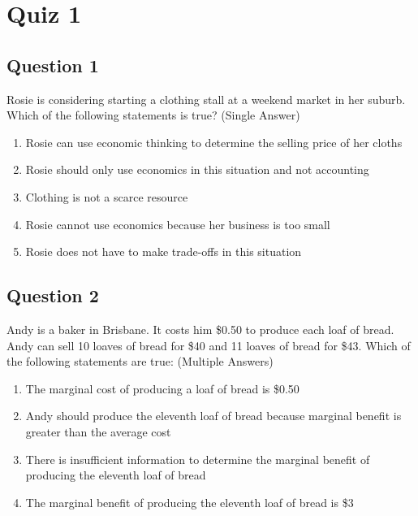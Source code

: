 \section{Quiz 1}

\subsection{Question 1}
Rosie is considering starting a clothing stall at a weekend market in her suburb. Which of the following statements is true? (Single Answer)
\begin{enumerate}
	\item Rosie can use economic thinking to determine the selling price of her cloths
	\item Rosie should only use economics in this situation and not accounting
	\item Clothing is not a scarce resource
	\item Rosie cannot use economics because her business is too small
	\item Rosie does not have to make trade-offs in this situation
\end{enumerate}

\subsection{Question 2}
Andy is a baker in Brisbane. It costs him \$0.50 to produce each loaf of bread. Andy can sell 10 loaves of bread for \$40 and 11 loaves of bread for \$43. Which of the following statements are true: (Multiple Answers)
\begin{enumerate}
	\item The marginal cost of producing a loaf of bread is \$0.50
	\item Andy should produce the eleventh loaf of bread because marginal benefit is greater than the average cost
	\item There is insufficient information to determine the marginal benefit of producing the eleventh loaf of bread
	\item The marginal benefit of producing the eleventh loaf of bread is \$3
\end{enumerate}

